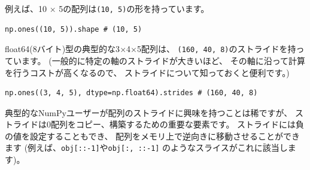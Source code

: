 \documentclass{jsarticle}
\begin{document}
        例えば、10 $\times$ 5の配列は\verb|(10, 5)|の形を持っています。

        \begin{lstlisting}
np.ones((10, 5)).shape # (10, 5)\end{lstlisting}

        float64(8バイト)型の典型的な3$\times$4$\times$5配列は、
        \verb|(160, 40, 8)|のストライドを持っています。
        (一般的に特定の軸のストライドが大きいほど、
        その軸に沿って計算を行うコストが高くなるので、
        ストライドについて知っておくと便利です。)

        \begin{lstlisting}
np.ones((3, 4, 5), dtype=np.float64).strides # (160, 40, 8)\end{lstlisting}

        典型的なNumPyユーザーが配列のストライドに興味を持つことは稀ですが、
        ストライドは0配列をコピー、構築するための重要な要素です。
        ストライドには負の値を設定することもでき、
        配列をメモリ上で逆向きに移動させることができます
        (例えば、\verb|obj[::-1]|や\verb|obj[:, ::-1]|
        のようなスライスがこれに該当します)。
\end{document}
